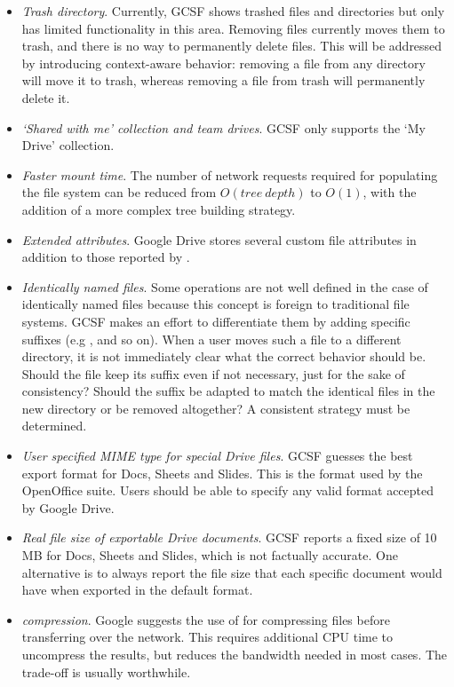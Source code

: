 \begin{itemize}
  \itemsep0em
  \item \emph{Trash directory}. Currently, GCSF shows trashed files and directories but only has limited functionality in this area. Removing files currently moves them to trash, and there is no way to permanently delete files. This will be addressed by introducing context-aware behavior: removing a file from any directory will move it to trash, whereas removing a file from trash will permanently delete it.
  \item \emph{`Shared with me' collection and team drives}. GCSF only supports the `My Drive' collection.
  \item \emph{Faster mount time}. The number of network requests required for populating the file system can be reduced from $ O(tree~depth) $ to $ O(1) $, with the addition of a more complex tree building strategy.
  \item \emph{Extended attributes}. Google Drive stores several custom file attributes in addition to those reported by .
  \item \emph{Identically named files}. Some operations are not well defined in the case of identically named files because this concept is foreign to traditional file systems. GCSF makes an effort to differentiate them by adding specific suffixes (e.g ,  and so on). When a user moves such a file to a different directory, it is not immediately clear what the correct behavior should be. Should the file keep its suffix even if not necessary, just for the sake of consistency? Should the suffix be adapted to match the identical files in the new directory or be removed altogether? A consistent strategy must be determined.
  \item \emph{User specified MIME type for special Drive files}. GCSF guesses the best export format for Docs, Sheets and Slides. This is the format used by the OpenOffice suite. Users should be able to specify any valid format accepted by Google Drive.
  \item \emph{Real file size of exportable Drive documents}. GCSF reports a fixed size of 10 MB for Docs, Sheets and Slides, which is not factually accurate. One alternative is to always report the file size that each specific document would have when exported in the default format.
  \item {} \emph{compression}. Google suggests the use of  for compressing files before transferring over the network. This requires additional CPU time to uncompress the results, but reduces the bandwidth needed in most cases. The trade-off is usually worthwhile.

\end{itemize}
